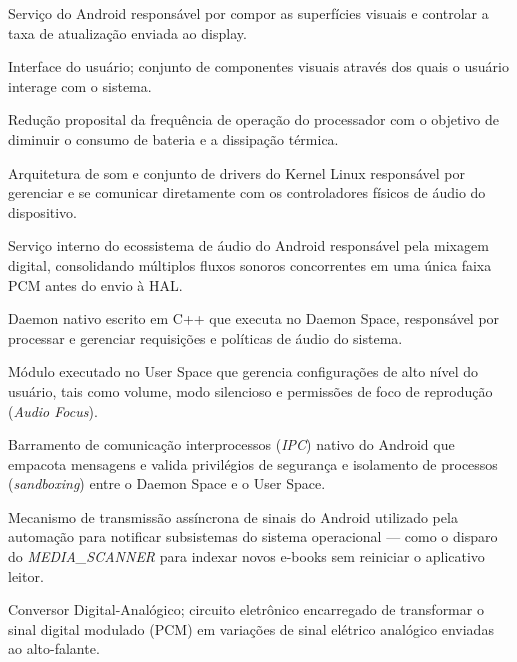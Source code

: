 \begin{description}[leftmargin=3.5cm, style=nextline]
    \item[\textbf{SurfaceFlinger}] Serviço do Android responsável por compor as superfícies visuais e controlar a taxa de atualização enviada ao display. 
    
    \item[\textbf{UI (\textit{User Interface})}] Interface do usuário; conjunto de componentes visuais através dos quais o usuário interage com o sistema. 
    
    \item[\textbf{Underclocking}] Redução proposital da frequência de operação do processador com o objetivo de diminuir o consumo de bateria e a dissipação térmica. 

    \item[\textbf{ALSA (\textit{Advanced Linux Sound Architecture})}] Arquitetura de som e conjunto de drivers do Kernel Linux responsável por gerenciar e se comunicar diretamente com os controladores físicos de áudio do dispositivo.

    \item[\textbf{AudioFlinger}] Serviço interno do ecossistema de áudio do Android responsável pela mixagem digital, consolidando múltiplos fluxos sonoros concorrentes em uma única faixa PCM antes do envio à HAL.

    \item[\textbf{AudioServer}] Daemon nativo escrito em C++ que executa no Daemon Space, responsável por processar e gerenciar requisições e políticas de áudio do sistema.

     \item[\textbf{AudioService}] Módulo executado no User Space que gerencia configurações de alto nível do usuário, tais como volume, modo silencioso e permissões de foco de reprodução (\textit{Audio Focus}).

     \item[\textbf{Binder}] Barramento de comunicação interprocessos (\textit{IPC}) nativo do Android que empacota mensagens e valida privilégios de segurança e isolamento de processos (\textit{sandboxing}) entre o Daemon Space e o User Space.

     \item[\textbf{Broadcast}] Mecanismo de transmissão assíncrona de sinais do Android utilizado pela automação para notificar subsistemas do sistema operacional — como o disparo do \textit{MEDIA\_SCANNER} para indexar novos e-books sem reiniciar o aplicativo leitor.

     \item[\textbf{DAC (\textit{Digital to Analog Converter})}] Conversor Digital-Analógico; circuito eletrônico encarregado de transformar o sinal digital modulado (PCM) em variações de sinal elétrico analógico enviadas ao alto-falante.


\end{description}

